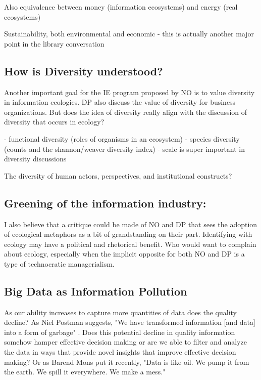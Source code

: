 Also equivalence between money (information ecosystems) and energy (real ecosystems)

Sustainability, both environmental and economic - this is actually another major point in the library conversation


\subsection{How is Diversity understood?}

Another important goal for the IE program proposed by NO is to value diversity in information ecologies. DP also discuss the value of diversity for business organizations. But does the idea of diversity really align with the discussion of diversity that occurs in ecology?

- functional diversity (roles of organisms in an ecosystem)
- species diversity (counts and the shannon/weaver diversity index)
- scale is super important in diversity discussions

The diversity of human actors, perspectives, and institutional constructs?

\subsection{Greening of the information industry:}

I also believe that a critique could be made of NO and DP that sees the adoption of ecological metaphors as a bit of grandstanding on their part. Identifying with ecology may have a political and rhetorical benefit. Who would want to complain about ecology, especially when the implicit opposite for both NO and DP is a type of technocratic managerialism.

\subsection{Big Data as Information Pollution}

As our ability increases to capture more quantities of data does the quality decline? As Niel Postman suggests, "We have transformed information [and data] into a form of garbage" \citep[cited in][p. 50]{stepp_1999}. Does this potential decline in quality information somehow hamper effective decision making or are we able to filter and analyze the data in ways that provide novel insights that improve effective decision making? Or as Barend Mons put it recently, "Data is like oil. We pump it from the earth. We spill it everywhere. We make a mess." \citep{mons_2016}

